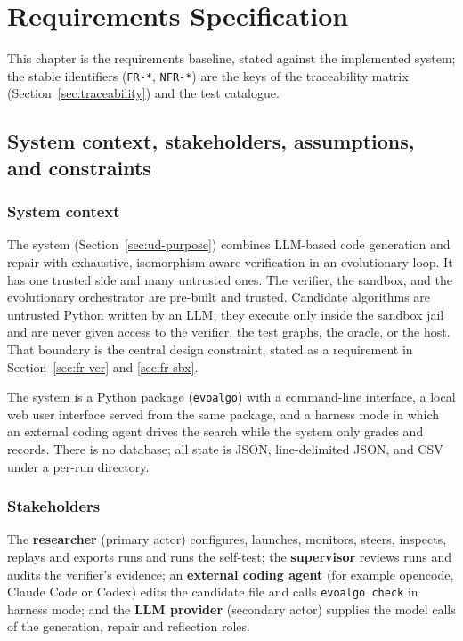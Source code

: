 \chapter{Requirements Specification}
\label{ch:requirements}

This chapter is the requirements baseline, stated against the implemented
system; the stable identifiers (\texttt{FR-*}, \texttt{NFR-*}) are the keys of
the traceability matrix (Section~\ref{sec:traceability}) and the test catalogue.

\section{System context, stakeholders, assumptions, and constraints}
\label{sec:context}

\subsection{System context}

The system (Section~\ref{sec:ud-purpose}) combines LLM-based code generation
and repair with exhaustive, isomorphism-aware verification in an evolutionary
loop. It has one trusted side and many untrusted ones. The verifier, the
sandbox, and the evolutionary orchestrator are pre-built and trusted. Candidate
algorithms are untrusted Python written by an LLM; they execute only inside the
sandbox jail and are never given access to the verifier, the test graphs, the
oracle, or the host. That boundary is the central design constraint, stated as
a requirement in Section~\ref{sec:fr-ver} and \ref{sec:fr-sbx}.

The system is a Python package (\texttt{evoalgo}) with a command-line
interface, a local web user interface served from the same package, and a
harness mode in which an external coding agent drives the search while the
system only grades and records. There is no database; all state is JSON,
line-delimited JSON, and CSV under a per-run directory.

\subsection{Stakeholders}

The \textbf{researcher} (primary actor) configures, launches, monitors, steers,
inspects, replays and exports runs and runs the self-test; the
\textbf{supervisor} reviews runs and audits the verifier's evidence; an
\textbf{external coding agent} (for example opencode, Claude Code or Codex) edits
the candidate file and calls \texttt{evoalgo check} in harness mode; and the
\textbf{LLM provider} (secondary actor) supplies the model calls of the
generation, repair and reflection roles.


